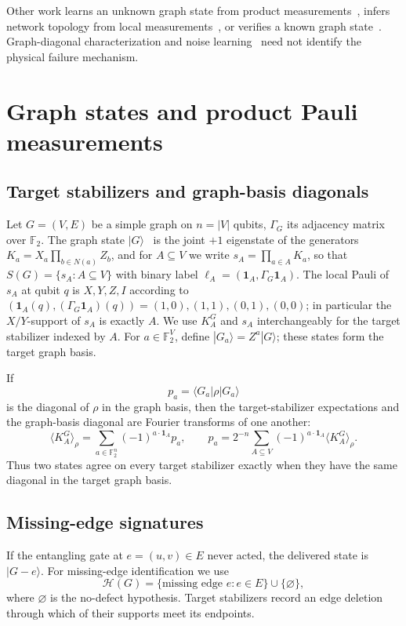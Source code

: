 \documentclass[11pt]{article}
\theoremstyle{remark}
\newcommand{\F}{\mathbb{F}}
\newcommand{\SG}{S(G)}
\begin{document}
Other work learns an unknown graph state from product measurements~\cite{OT22}, infers network topology from local measurements~\cite{ChenTopology23}, or verifies a known graph state~\cite{PLM18,ZhuHayashi19,DHZ20,Theis25}.  Graph-diagonal characterization and noise learning~\cite{ParkSunJeong25,WangEtAl25,SahaOllivier26} need not identify the physical failure mechanism.

\section{Graph states and product Pauli measurements}\label{sec:prelim}

\subsection{Target stabilizers and graph-basis diagonals}
Let $G=(V,E)$ be a simple graph on $n=|V|$ qubits, $\Gamma_G$ its adjacency matrix over $\F_2$. The graph state $|G\rangle$~\cite{Hein06} is the joint $+1$ eigenstate of the generators $K_a=X_a\prod_{b\in N(a)}Z_b$, and for $A\subseteq V$ we write $s_A=\prod_{a\in A}K_a$, so that $\SG=\{s_A:A\subseteq V\}$ with binary label $\ell_A=(\mathbf 1_A,\Gamma_G\mathbf 1_A)$. The local Pauli of $s_A$ at qubit $q$ is $X,Y,Z,I$ according to $(\mathbf 1_A(q),(\Gamma_G\mathbf 1_A)(q))=(1,0),(1,1),(0,1),(0,0)$; in particular the $X/Y$-support of $s_A$ is exactly $A$.
We use $K_A^G$ and $s_A$ interchangeably for the target stabilizer indexed by $A$. For $a\in\F_2^V$, define $|G_a\rangle=Z^a|G\rangle$; these states form the target graph basis.

If
\[
p_a=\langle G_a|\rho|G_a\rangle
\]
is the diagonal of \(\rho\) in the graph basis, then the target-stabilizer expectations and the graph-basis diagonal are Fourier transforms of one another:
\[
\langle K_A^G\rangle_\rho = \sum_{a\in\F_2^n}(-1)^{a\cdot \mathbf 1_A}p_a,
\qquad
p_a=2^{-n}\sum_{A\subseteq V}(-1)^{a\cdot \mathbf 1_A}\langle K_A^G\rangle_\rho.
\]
Thus two states agree on every target stabilizer exactly when they have the same diagonal in the target graph basis.

\subsection{Missing-edge signatures}
If the entangling gate at $e=(u,v)\in E$ never acted, the delivered state is $|G-e\rangle$. For missing-edge identification we use
\[
\mathcal H(G)=\{\text{missing edge }e:e\in E\}\cup\{\varnothing\},
\]
where $\varnothing$ is the no-defect hypothesis.  Target stabilizers record an edge deletion through which of their supports meet its endpoints.
\end{document}
